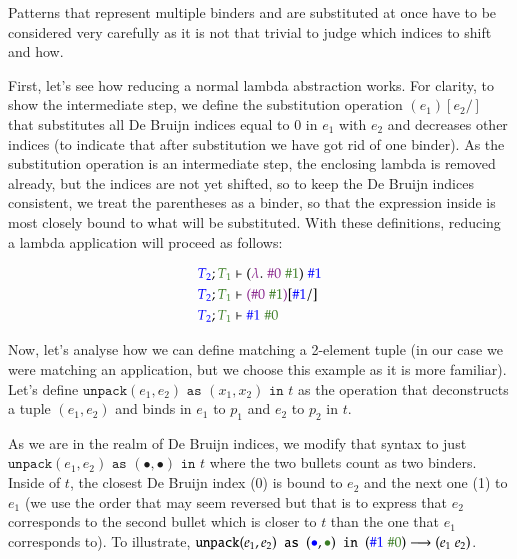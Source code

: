 \documentclass[runningheads]{article}
\begin{document}
Patterns that represent multiple binders and are substituted at once have to be considered very carefully as it is not that trivial to judge which indices to shift and how.

First, let's see how reducing a normal lambda abstraction works. For clarity, to show the intermediate step, we define the substitution operation $(e_1)[e_2/]$ that substitutes all De Bruijn indices equal to 0 in $e_1$ with $e_2$ and decreases other indices (to indicate that after substitution we have got rid of one binder). As the substitution operation is an intermediate step, the enclosing lambda is removed already, but the indices are not yet shifted, so to keep the De Bruijn indices consistent, we treat the parentheses as a binder, so that the expression inside is most closely bound to what will be substituted. With these definitions, reducing a lambda application will proceed as follows:

\begin{align*}
{\color{blue}T_2}; {\color{OliveGreen}T_1} &\vdash ({\color{Fuchsia}\lambda}. \; {\color{Fuchsia}\#0} \; {\color{OliveGreen}\#1}) \; {\color{blue}\#1} \\
{\color{blue}T_2}; {\color{OliveGreen}T_1} &\vdash {\color{Fuchsia}({\color{Fuchsia}\#0} \; {\color{OliveGreen}\#1})}[{\color{blue}\#1}/] \\
{\color{blue}T_2}; {\color{OliveGreen}T_1} &\vdash {\color{blue}\#1} \; {\color{OliveGreen}\#0}
\end{align*}

Now, let's analyse how we can define matching a 2-element tuple (in our case we were matching an application, but we choose this example as it is more familiar). Let's define $\texttt{unpack} (e_1, e_2) \texttt{ as } (x_1, x_2) \texttt{ in } t$ as the operation that deconstructs a tuple $(e_1, e_2)$ and binds in $e_1$ to $p_1$ and $e_2$ to $p_2$ in $t$.

As we are in the realm of De Bruijn indices, we modify that syntax to just $\texttt{unpack} (e_1, e_2) \texttt{ as } (\bullet, \bullet) \texttt{ in } t$ where the two bullets count as two binders. Inside of $t$, the closest De Bruijn index (0) is bound to $e_2$ and the next one (1) to $e_1$ (we use the order that may seem reversed but that is to express that $e_2$ corresponds to the second bullet which is closer to $t$ than the one that $e_1$ corresponds to). To illustrate, $\texttt{unpack} (e_1, e_2) \texttt{ as } ({\color{blue}\bullet}, {\color{OliveGreen}\bullet}) \texttt{ in } ({\color{blue}\#1} \; {\color{OliveGreen}\#0}) \longrightarrow (e_1 \; e_2)$.
\end{document}
